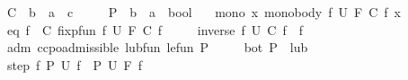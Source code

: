 \begin{isabellebody}
\ \ \ \ \ C\ {\isacharcolon}{\kern0pt}{\isacharcolon}{\kern0pt}\ {\isachardoublequoteopen}{\isacharparenleft}{\kern0pt}{\isacharprime}{\kern0pt}b\ {\isasymRightarrow}\ {\isacharprime}{\kern0pt}a{\isacharparenright}{\kern0pt}\ {\isasymRightarrow}\ {\isacharprime}{\kern0pt}c{\isachardoublequoteclose}\isanewline
\ \ \ \ \ P\ {\isacharcolon}{\kern0pt}{\isacharcolon}{\kern0pt}\ {\isachardoublequoteopen}{\isacharparenleft}{\kern0pt}{\isacharprime}{\kern0pt}b\ {\isasymRightarrow}\ {\isacharprime}{\kern0pt}a{\isacharparenright}{\kern0pt}\ {\isasymRightarrow}\ bool{\isachardoublequoteclose}\isanewline
\ \ \ mono{\isacharcolon}{\kern0pt}\ {\isachardoublequoteopen}{\isasymAnd}x{\isachardot}{\kern0pt}\ mono{\isacharunderscore}{\kern0pt}body\ {\isacharparenleft}{\kern0pt}{\isasymlambda}f{\isachardot}{\kern0pt}\ U\ {\isacharparenleft}{\kern0pt}F\ {\isacharparenleft}{\kern0pt}C\ f{\isacharparenright}{\kern0pt}{\isacharparenright}{\kern0pt}\ x{\isacharparenright}{\kern0pt}{\isachardoublequoteclose}\isanewline
\ \ \ \ \ eq{\isacharcolon}{\kern0pt}\ {\isachardoublequoteopen}f\ {\isasymequiv}\ C\ {\isacharparenleft}{\kern0pt}fixp{\isacharunderscore}{\kern0pt}fun\ {\isacharparenleft}{\kern0pt}{\isasymlambda}f{\isachardot}{\kern0pt}\ U\ {\isacharparenleft}{\kern0pt}F\ {\isacharparenleft}{\kern0pt}C\ f{\isacharparenright}{\kern0pt}{\isacharparenright}{\kern0pt}{\isacharparenright}{\kern0pt}{\isacharparenright}{\kern0pt}{\isachardoublequoteclose}\isanewline
\ \ \ \ \ inverse{\isacharcolon}{\kern0pt}\ {\isachardoublequoteopen}{\isasymAnd}f{\isachardot}{\kern0pt}\ U\ {\isacharparenleft}{\kern0pt}C\ f{\isacharparenright}{\kern0pt}\ {\isacharequal}{\kern0pt}\ f{\isachardoublequoteclose}\isanewline
\ \ \ \ \ adm{\isacharcolon}{\kern0pt}\ {\isachardoublequoteopen}ccpo{\isachardot}{\kern0pt}admissible\ lub{\isacharunderscore}{\kern0pt}fun\ le{\isacharunderscore}{\kern0pt}fun\ P{\isachardoublequoteclose}\isanewline
\ \ \ \ \ bot{\isacharcolon}{\kern0pt}\ {\isachardoublequoteopen}P\ {\isacharparenleft}{\kern0pt}{\isasymlambda}{\isacharunderscore}{\kern0pt}{\isachardot}{\kern0pt}\ lub\ {\isacharbraceleft}{\kern0pt}{\isacharbraceright}{\kern0pt}{\isacharparenright}{\kern0pt}{\isachardoublequoteclose}\isanewline
\ \ \ \ \ step{\isacharcolon}{\kern0pt}\ {\isachardoublequoteopen}{\isasymAnd}f{\isachardot}{\kern0pt}\ P\ {\isacharparenleft}{\kern0pt}U\ f{\isacharparenright}{\kern0pt}\ {\isasymLongrightarrow}\ P\ {\isacharparenleft}{\kern0pt}U\ {\isacharparenleft}{\kern0pt}F\ f{\isacharparenright}{\kern0pt}{\isacharparenright}{\kern0pt}{\isachardoublequoteclose}\isanewline

\end{isabellebody}
